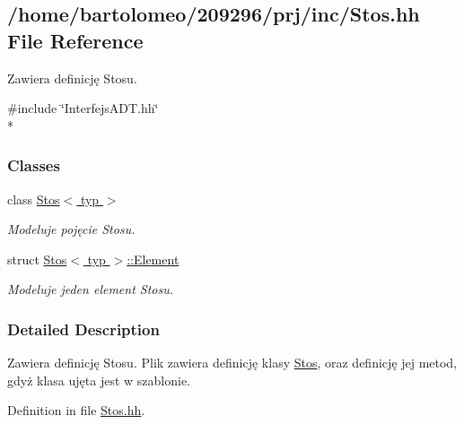 \hypertarget{_stos_8hh}{\subsection{/home/bartolomeo/209296/prj/inc/\-Stos.hh File Reference}
\label{_stos_8hh}
}


Zawiera definicję Stosu.  


{\ttfamily \#include \char`\"{}Interfejs\-A\-D\-T.\-hh\char`\"{}}\\*
\subsubsection*{Classes}
\begin{DoxyCompactItemize}
\item 
class \hyperlink{class_stos}{Stos$<$ typ $>$}
\begin{DoxyCompactList}\small\item\em Modeluje pojęcie Stosu. \end{DoxyCompactList}\item 
struct \hyperlink{struct_stos_1_1_element}{Stos$<$ typ $>$\-::\-Element}
\begin{DoxyCompactList}\small\item\em Modeluje jeden element Stosu. \end{DoxyCompactList}\end{DoxyCompactItemize}


\subsubsection{Detailed Description}
Zawiera definicję Stosu. Plik zawiera definicję klasy \hyperlink{class_stos}{Stos}, oraz definicję jej metod, gdyż klasa ujęta jest w szablonie. 

Definition in file \hyperlink{_stos_8hh_source}{Stos.\-hh}.

